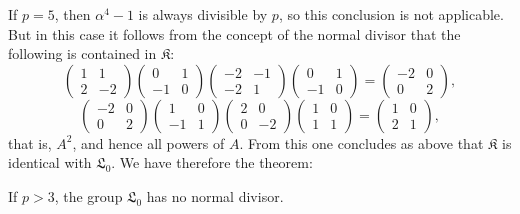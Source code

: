 \documentclass[11pt]{article}
\providecommand{\Lzero}{\mathfrak L_0}
\providecommand{\Kgrp}{\mathfrak K}
\begin{document}
If $p=5$, then $\alpha^4-1$ is always divisible by $p$, so this conclusion is not applicable. But in this case it follows from the concept of the normal divisor that the following is contained in $\Kgrp$:
\[
\begin{pmatrix}1&1\\2&-2\end{pmatrix}
\begin{pmatrix}0&1\\-1&0\end{pmatrix}
\begin{pmatrix}-2&-1\\-2&1\end{pmatrix}
\begin{pmatrix}0&1\\-1&0\end{pmatrix}
=\begin{pmatrix}-2&0\\0&2\end{pmatrix},
\]
\[
\begin{pmatrix}-2&0\\0&2\end{pmatrix}
\begin{pmatrix}1&0\\-1&1\end{pmatrix}
\begin{pmatrix}2&0\\0&-2\end{pmatrix}
\begin{pmatrix}1&0\\1&1\end{pmatrix}
=\begin{pmatrix}1&0\\2&1\end{pmatrix},
\]
that is, $A^2$, and hence all powers of $A$. From this one concludes as above that $\Kgrp$ is identical with $\Lzero$. We have therefore the theorem:

If $p>3$, the group $\Lzero$ has no normal divisor.
\end{document}
